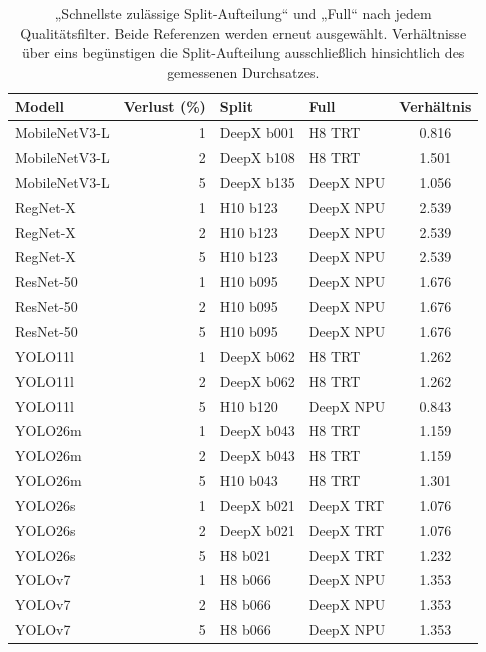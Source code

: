 \begin{table}[!htb]
\centering\small\setlength{\tabcolsep}{3pt}
\caption{„Schnellste zulässige Split-Aufteilung“ und „Full“ nach jedem Qualitätsfilter. Beide Referenzen werden erneut ausgewählt. Verhältnisse über eins begünstigen die Split-Aufteilung ausschließlich hinsichtlich des gemessenen Durchsatzes.}
\label{tab:review:thresholds}
\begin{tabular*}{\linewidth}{@{\extracolsep{\fill}}l r l l S[table-format=1.3]@{}}
\toprule
Modell & {Verlust (\%)} & Split & Full & {Verhältnis} \\
\midrule
MobileNetV3-L & 1 & DeepX b001 & H8 TRT & 0.816 \\
MobileNetV3-L & 2 & DeepX b108 & H8 TRT & 1.501 \\
MobileNetV3-L & 5 & DeepX b135 & DeepX NPU & 1.056 \\
RegNet-X & 1 & H10 b123 & DeepX NPU & 2.539 \\
RegNet-X & 2 & H10 b123 & DeepX NPU & 2.539 \\
RegNet-X & 5 & H10 b123 & DeepX NPU & 2.539 \\
ResNet-50 & 1 & H10 b095 & DeepX NPU & 1.676 \\
ResNet-50 & 2 & H10 b095 & DeepX NPU & 1.676 \\
ResNet-50 & 5 & H10 b095 & DeepX NPU & 1.676 \\
YOLO11l & 1 & DeepX b062 & H8 TRT & 1.262 \\
YOLO11l & 2 & DeepX b062 & H8 TRT & 1.262 \\
YOLO11l & 5 & H10 b120 & DeepX NPU & 0.843 \\
YOLO26m & 1 & DeepX b043 & H8 TRT & 1.159 \\
YOLO26m & 2 & DeepX b043 & H8 TRT & 1.159 \\
YOLO26m & 5 & H10 b043 & H8 TRT & 1.301 \\
YOLO26s & 1 & DeepX b021 & DeepX TRT & 1.076 \\
YOLO26s & 2 & DeepX b021 & DeepX TRT & 1.076 \\
YOLO26s & 5 & H8 b021 & DeepX TRT & 1.232 \\
YOLOv7 & 1 & H8 b066 & DeepX NPU & 1.353 \\
YOLOv7 & 2 & H8 b066 & DeepX NPU & 1.353 \\
YOLOv7 & 5 & H8 b066 & DeepX NPU & 1.353 \\
\bottomrule\end{tabular*}\end{table}
